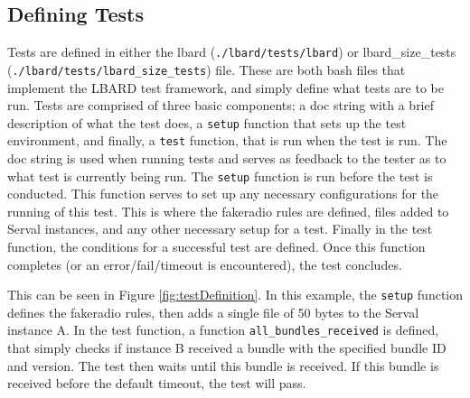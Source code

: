 \subsection{Defining Tests}
Tests are defined in either the lbard (\verb|./lbard/tests/lbard|) or lbard\_size\_tests (\verb|./lbard/tests/lbard_size_tests|) file. 
These are both bash files that implement the LBARD test framework, and simply define what tests are to be run.
Tests are comprised of three basic components; a doc string with a brief description of what the test does, a \verb|setup| function that sets up the test environment, and finally, a \verb|test| function, that is run when the test is run.
The doc string is used when running tests and serves as feedback to the tester as to what test is currently being run.
The \verb|setup| function is run before the test is conducted. This function serves to set up any necessary configurations for the running of this test. This is where the fakeradio rules are defined, files added to Serval instances, and any other necessary setup for a test.
Finally in the test function, the conditions for a successful test are defined. Once this function completes (or an error/fail/timeout is encountered), the test concludes.


This can be seen in Figure \ref{fig:testDefinition}. 
In this example, the \verb|setup| function defines the fakeradio rules, then adds a single file of 50 bytes to the Serval instance A. 
In the test function, a function \verb|all_bundles_received| is defined, that simply checks if instance B received a bundle with the specified bundle ID and version. 
The test then waits until this bundle is received. 
If this bundle is received before the default timeout, the test will pass.

